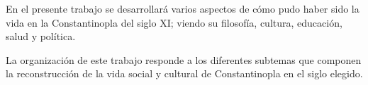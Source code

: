 En el presente trabajo se desarrollará varios aspectos de cómo 
pudo haber sido la vida en la Constantinopla del siglo XI; viendo 
su filosofía, cultura, educación, salud y política. 

La organización de este trabajo responde a los diferentes
subtemas que componen la reconstrucción de la vida social y
cultural de Constantinopla en el siglo elegido.


